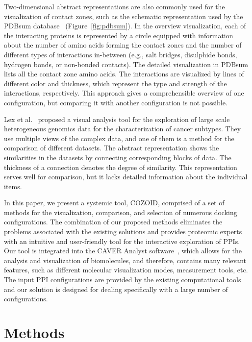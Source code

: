 \documentclass{bmcart}
\begin{document}
Two-dimensional abstract representations are also commonly used for the visualization of contact zones, such as the schematic representation used by the PDBsum database~\cite{pdbsum} (Figure~\ref{fig:pdbsum}).
In the overview visualization, each of the interacting proteins is represented by a circle equipped with information about the number of amino acids forming the contact zones and the number of different types of interactions in-between (e.g., salt bridges, disulphide bonds, hydrogen bonds, or non-bonded contacts).
The detailed visualization in PDBsum lists all the contact zone amino acids. 
The interactions are visualized by lines of different color and thickness, which represent the type and strength of the interactions, respectively. 
This approach gives a comprehensible overview of one configuration, but comparing it with another configuration is not possible.


Lex et al.~\cite{Lex2012} proposed a visual analysis tool for the exploration of large scale heterogeneous genomics data for the characterization of cancer subtypes.
They use multiple views of the complex data, and one of them is a method for the comparison of different datasets.
The abstract representation shows the similarities in the datasets by connecting corresponding blocks of data. 
The thickness of a connection denotes the degree of similarity. 
This representation serves well for comparison, but it lacks detailed information about the individual items.

In this paper, we present a systemic tool, COZOID, comprised of a set of methods for the visualization, comparison, and selection of numerous docking configurations.
The combination of our proposed methods eliminates the problems associated with the existing solutions and provides proteomic experts with an intuitive and user-friendly tool for the interactive exploration of PPIs.
Our tool is integrated into the CAVER Analyst software~\cite{kozlikova2014caver}, which allows for the analysis and visualization of biomolecules, and therefore, contains many relevant features, such as different molecular visualization modes, measurement tools, etc.  
The input PPI configurations are provided by the existing computational tools and our solution is designed for dealing specifically with a large number of configurations.

\section*{Methods}
\end{document}

